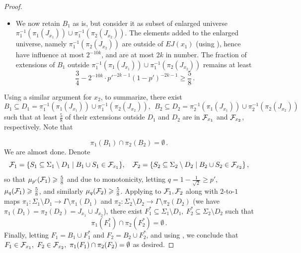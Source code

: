 \documentclass{toc}
\renewcommand\geq{\geqslant}
\begin{document}
\begin{proof}
\begin{itemize}
      at least $\frac{3}{4}$ of extensions of $B_1$ outside $  \pi_1^{-1} ( \pi_1( J_{x_1} ) ) $
      are in ${\cal F}_{x_1}$.
\item We now retain $B_1$ as is, but consider it as subset of enlarged universe $ \pi_1^{-1}( \pi_1 ( J_{x_1}  ) ) \cup  \pi_1^{-1} ( \pi_2  ( J_{x_2} ) ) $.
      The elements added to the enlarged universe, namely  $\pi_1^{-1} ( \pi_2  ( J_{x_2} ) )$
      are outside of $EJ(x_1)$ (using ), hence have influence at most $2^{-10k}$, and are at most $2k$ in number. %
%
%
%
%
      The fraction of extensions of
      $B_1$ outside $ \pi_1^{-1}( \pi_1 ( J_{x_1}  ) ) \cup  \pi_1^{-1} ( \pi_2  ( J_{x_2} ) ) $
      remains at least $$\frac{3}{4}- 2^{-10k} \cdot {p'}^{-2k-1}(1-p')^{-2k-1} \geq \frac{5}{8}\,.$$%
\end{itemize}

Using a similar argument for $x_2$, to summarize, there exist
 $$ B_1 \subseteq  D_1 = \pi_1^{-1}( \pi_1 ( J_{x_1}  ) ) \cup  \pi_1^{-1} ( \pi_2  ( J_{x_2} ) )
     , \ \  B_2 \subseteq D_2  = \pi_2^{-1}( \pi_1 ( J_{x_1}  ) ) \cup  \pi_2^{-1} ( \pi_2  ( J_{x_2} ) )   $$
such that at least $\frac{5}{8}$ of their extensions outside
$D_1$ and $D_2$ %
%
are in ${\cal F}_{x_1}$ and ${\cal F}_{x_2}$, respectively.  %
Note that

 \begin{equation} \label{eq:B}
 \pi_1(B_1) \cap \pi_2(B_2) = \emptyset\,.%
 \end{equation}
 We are almost done.
 Denote
  $$ {\cal F}_1 = \{ S_1 \subseteq  \Sigma_1 \setminus D_1 \mid B_1 \cup S_1 \in {\cal F}_{x_1}\}, \quad
     {\cal F}_2 = \{ S_2 \subseteq  \Sigma_2 \setminus D_2 \mid B_2 \cup S_2 \in {\cal F}_{x_2}\}\,, $$%
so that $\mu_{p'} ({\cal F}_1) \geq \frac{5}{8}$ and due to monotonicity, letting $q = 1-\frac{1}{\sqrt{2}} \geq p'$, $\mu_{q} ({\cal F}_1) \geq \frac{5}{8}$,
and similarly    $\mu_{q} ({\cal F}_2) \geq \frac{5}{8}$.  Applying  to $ {\cal F}_1, {\cal F}_2$ along with $2$-to-$1$
 maps $\pi_1: \Sigma_1 \setminus D_1 \to \Gamma
\setminus \pi_1(D_1)$  and  $\pi_2: \Sigma_2 \setminus D_2 \to \Gamma
\setminus \pi_2(D_2)$ (we have $\pi_1 (D_1) = \pi_2(D_2) = J_{x_1} \cup J_{x_2}$),
there exist $F_1^* \subseteq  \Sigma_1 \setminus D_1, ~F_2^* \subseteq  \Sigma_2 \setminus D_2$ such that
\begin{equation} \label{eq:F-star}
 \pi_1 (F_1^*)  \cap \pi_2 (F_2^*) = \emptyset\,.%
 \end{equation}
 Finally, letting $F_1 = B_1 \cup  F_1^*$  and  $F_2 = B_2 \cup  F_2^*$, and using
 , %
we conclude that
 $F_1 \in {\cal F}_{x_1}, ~F_2 \in {\cal F}_{x_2}, ~\pi_1(F_1) \cap \pi_2(F_2) = \emptyset$ as desired.
 \end{proof}
\end{document}

